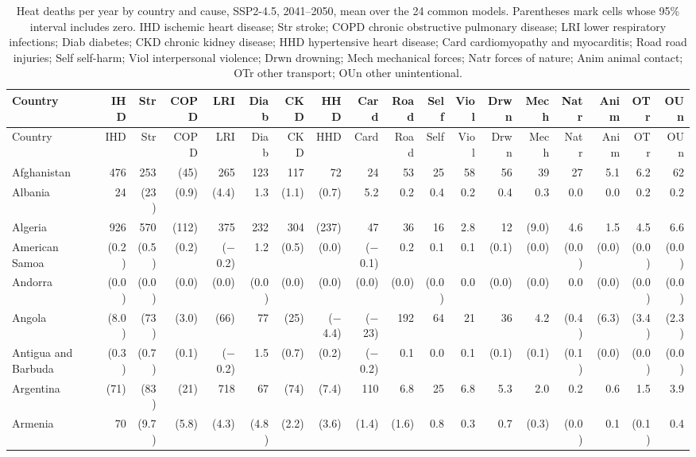 \begin{longtable}{lrrrrrrrrrrrrrrrrr}
\caption{Heat deaths per year by country and cause, SSP2-4.5, 2041--2050, mean over the 24 common models. Parentheses mark cells whose 95\% interval includes zero. IHD ischemic heart disease; Str stroke; COPD chronic obstructive pulmonary disease; LRI lower respiratory infections; Diab diabetes; CKD chronic kidney disease; HHD hypertensive heart disease; Card cardiomyopathy and myocarditis; Road road injuries; Self self-harm; Viol interpersonal violence; Drwn drowning; Mech mechanical forces; Natr forces of nature; Anim animal contact; OTr other transport; OUn other unintentional.}\label{tab:causeheat}\\
\toprule
Country & IHD & Str & COPD & LRI & Diab & CKD & HHD & Card & Road & Self & Viol & Drwn & Mech & Natr & Anim & OTr & OUn \\
\midrule
\endfirsthead
\toprule
Country & IHD & Str & COPD & LRI & Diab & CKD & HHD & Card & Road & Self & Viol & Drwn & Mech & Natr & Anim & OTr & OUn \\
\midrule
\endhead
\bottomrule
\endfoot
Afghanistan & 476 & 253 & (45) & 265 & 123 & 117 & 72 & 24 & 53 & 25 & 58 & 56 & 39 & 27 & 5.1 & 6.2 & 62 \\
Albania & 24 & (23) & (0.9) & (4.4) & 1.3 & (1.1) & (0.7) & 5.2 & 0.2 & 0.4 & 0.2 & 0.4 & 0.3 & 0.0 & 0.0 & 0.2 & 0.2 \\
Algeria & 926 & 570 & (112) & 375 & 232 & 304 & (237) & 47 & 36 & 16 & 2.8 & 12 & (9.0) & 4.6 & 1.5 & 4.5 & 6.6 \\
American Samoa & (0.2) & (0.5) & (0.2) & ($-$0.2) & 1.2 & (0.5) & (0.0) & ($-$0.1) & 0.2 & 0.1 & 0.1 & (0.1) & (0.0) & (0.0) & (0.0) & (0.0) & (0.0) \\
Andorra & (0.0) & (0.0) & (0.0) & (0.0) & (0.0) & (0.0) & (0.0) & (0.0) & (0.0) & (0.0) & 0.0 & (0.0) & (0.0) & 0.0 & (0.0) & (0.0) & (0.0) \\
Angola & (8.0) & (73) & (3.0) & (66) & 77 & (25) & ($-$4.4) & ($-$23) & 192 & 64 & 21 & 36 & 4.2 & (0.4) & (6.3) & (3.4) & (2.3) \\
Antigua and Barbuda & (0.3) & (0.7) & (0.1) & ($-$0.2) & 1.5 & (0.7) & (0.2) & ($-$0.2) & 0.1 & 0.0 & 0.1 & (0.1) & (0.1) & (0.1) & (0.0) & (0.0) & (0.0) \\
Argentina & (71) & (83) & (21) & 718 & 67 & (74) & (7.4) & 110 & 6.8 & 25 & 6.8 & 5.3 & 2.0 & 0.2 & 0.6 & 1.5 & 3.9 \\
Armenia & 70 & (9.7) & (5.8) & (4.3) & (4.8) & (2.2) & (3.6) & (1.4) & (1.6) & 0.8 & 0.3 & 0.7 & (0.3) & (0.0) & 0.1 & (0.1) & 0.4 \\

\end{longtable}
